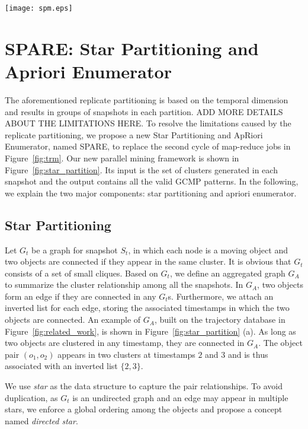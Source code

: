 \begin{figure*}[t]
\centering
\texttt{[image: spm.eps]}
\caption{Star partition and mining. (a) Conceptual connection graph from Figure 1.(b) Five star partitions are generated
(c) Apriori Mining with various pruning techniques.}
\label{fig:star_partition}
\end{figure*}

\section{SPARE: Star Partitioning and Apriori Enumerator}
\label{sec:spm}
The aforementioned replicate partitioning is based on the temporal dimension 
and results in groups of snapshots in each partition. ADD MORE DETAILS ABOUT THE LIMITATIONS HERE.
To resolve the limitations caused by the replicate partitioning, 
we propose a new Star Partitioning and ApRiori Enumerator, named SPARE, 
to replace the second cycle of map-reduce jobs in Figure~\ref{fig:trm}. 
Our new parallel mining framework is shown in Figure~\ref{fig:star_partition}. 
Its input is the set of clusters generated in each snapshot and the output 
contains all the valid GCMP patterns. In the following, we explain the two major components: 
star partitioning and apriori enumerator.


\subsection{Star Partitioning}
Let $G_t$ be a graph for snapshot $S_t$, in which each node 
is a moving object and two objects are connected if they appear 
in the same cluster. It is obvious that $G_t$ consists of a set of small cliques. 
Based on $G_t$, we define an aggregated graph $G_A$ to summarize the 
cluster relationship among all the snapshots. In $G_A$, two objects
form an edge if they are connected in any $G_t$s. Furthermore, 
we attach an inverted list for each edge, 
storing the associated timestamps in which the two objects are connected. 
An example of $G_A$, built on the trajectory database in Figure~\ref{fig:related_work}, 
is shown in Figure~\ref{fig:star_partition} (a). 
As long as two objects are clustered in any timestamp, they are connected in $G_A$. 
The object pair $(o_1,o_2)$ appears in two clusters at timestamps 
$2$ and $3$ and is thus associated with an inverted list $\{2,3\}$.


We use \emph{star} as the data structure to capture the pair relationships. 
To avoid duplication, as $G_t$ is an undirected graph and an edge may appear in multiple stars, 
we enforce a global ordering among the objects and propose a concept named \textit{directed star}.

